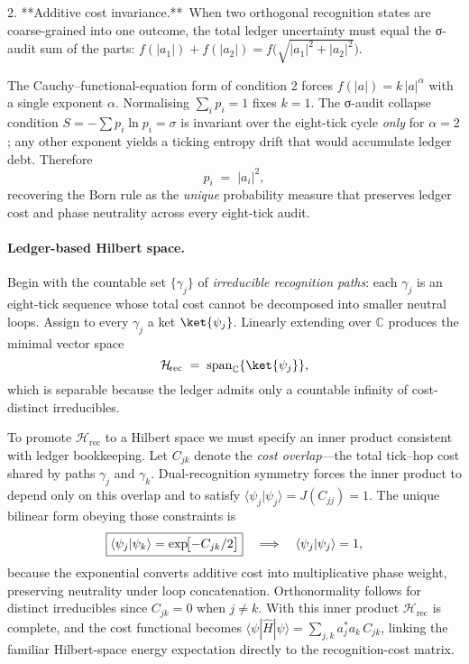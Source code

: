 \documentclass[11pt,oneside]{book}
\begin{document}
2. **Additive cost invariance.** When two orthogonal recognition states
   are coarse-grained into one outcome, the total ledger uncertainty
   must equal the σ-audit sum of the parts:
   \(f(|a_1|)^{} + f(|a_2|) = f\!\bigl(\sqrt{|a_1|^{2}+|a_2|^{2}}\bigr)\).

The Cauchy–functional-equation form of condition 2 forces
\(f(|a|)=k\,|a|^{\alpha}\) with a single exponent \(\alpha\).  Normalising
\(\sum_i p_i=1\) fixes \(k=1\).  The σ-audit collapse condition
\(S=-\sum p_i\ln p_i =\sigma\) is invariant over the eight-tick cycle
\emph{only} for \(\alpha=2\); any other exponent yields a ticking
entropy drift that would accumulate ledger debt.  Therefore
\[
   p_i
   \;=\;
   |a_i|^{2},
\]
recovering the Born rule as the \emph{unique} probability measure that
preserves ledger cost and phase neutrality across every eight-tick audit.

\paragraph*{Ledger-based Hilbert space.}
Begin with the countable set \(\{\gamma_j\}\) of \emph{irreducible
recognition paths}: each \(\gamma_j\) is an eight-tick sequence whose
total cost cannot be decomposed into smaller neutral loops.  Assign to
every \(\gamma_j\) a ket \(\ket{\psi_j}\).  Linearly extending over
\(\mathbb C\) produces the minimal vector space  
\[
   \mathcal H_{\!\text{rec}}
   \;=\;
   \mathrm{span}_{\mathbb C}\{\ket{\psi_j}\},
\]
which is separable because the ledger admits only a countable infinity
of cost-distinct irreducibles.

To promote \(\mathcal H_{\!\text{rec}}\) to a Hilbert space we must
specify an inner product consistent with ledger bookkeeping.  Let
\(C_{jk}\) denote the \emph{cost overlap}—the total tick–hop cost shared
by paths \(\gamma_j\) and \(\gamma_k\).  Dual-recognition symmetry
forces the inner product to depend only on this overlap and to satisfy
\(\langle\psi_j|\psi_j\rangle = J(C_{jj}) = 1\).  The unique bilinear
form obeying those constraints is  
\[
   \boxed{%
     \langle\psi_j|\psi_k\rangle
     = 
     \exp\!\bigl[-C_{jk}/2\bigr]}
   \quad\Longrightarrow\quad
   \langle\psi_j|\psi_j\rangle = 1 ,
\]
because the exponential converts additive cost into multiplicative phase
weight, preserving neutrality under loop concatenation.  Orthonormality
follows for distinct irreducibles since \(C_{jk}=0\) when \(j\neq k\).
With this inner product \(\mathcal H_{\!\text{rec}}\) is complete, and
the cost functional becomes  
\(\langle\psi|\hat H|\psi\rangle = \sum_{j,k} a_j^{*}a_k\,C_{jk}\),
linking the familiar Hilbert-space energy expectation directly to the
recognition-cost matrix.
\end{document}
